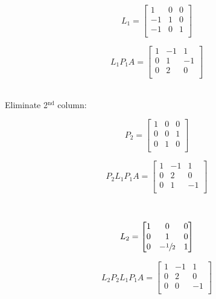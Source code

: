 \documentclass[12pt]{article}
\begin{document}
\begin{minipage}[t]{0.5\textwidth}
    $$
        L_1 =
        \begin{bmatrix}
            1  & 0 & 0 \\
            -1 & 1 & 0 \\
            -1 & 0 & 1 \\
        \end{bmatrix}
    $$
\end{minipage}
\begin{minipage}[t]{0.5\textwidth}
    $$
        L_1P_1A =
        \begin{bmatrix}
            1 & -1 & 1  \\
            0 & 1  & -1 \\
            0 & 2  & 0  \\
        \end{bmatrix}
    $$
\end{minipage}\\

Eliminate 2$^{\text{nd}}$ column:\\
\begin{minipage}[t]{0.5\textwidth}
    $$
        P_2 =
        \begin{bmatrix}
            1 & 0 & 0 \\
            0 & 0 & 1 \\
            0 & 1 & 0 \\
        \end{bmatrix}
    $$
\end{minipage}
\begin{minipage}[t]{0.5\textwidth}
    $$
        P_2 L_1P_1A =
        \begin{bmatrix}
            1 & -1 & 1  \\
            0 & 2  & 0  \\
            0 & 1  & -1 \\
        \end{bmatrix}
    $$
\end{minipage}\\
\begin{minipage}[t]{0.5\textwidth}
    $$
        L_2 =
        \begin{bmatrix}
            1 & 0             & 0 \\
            0 & 1             & 0 \\
            0 & -\sfrac{1}{2} & 1 \\
        \end{bmatrix}
    $$
\end{minipage}
\begin{minipage}[t]{0.5\textwidth}
    $$
        L_2 P_2 L_1P_1A =
        \begin{bmatrix}
            1 & -1 & 1  \\
            0 & 2  & 0  \\
            0 & 0  & -1 \\
        \end{bmatrix}
    $$
\end{minipage}\\
\end{document}
